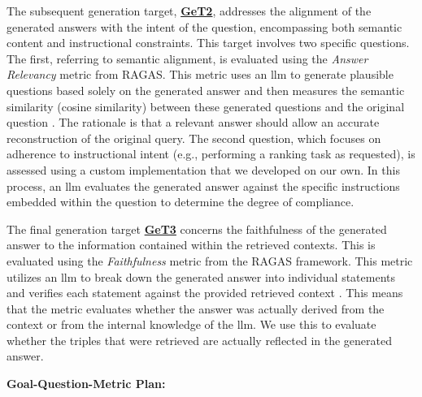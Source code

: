 The subsequent generation target, \hyperref[enum:get2]{\textbf{GeT2}}, addresses the alignment of the generated answers with the intent of the question, encompassing both semantic content and instructional constraints. This target involves two specific questions. The first, referring to semantic alignment, is evaluated using the \emph{Answer Relevancy} metric from RAGAS. This metric uses an \gls{llm} to generate plausible questions based solely on the generated answer and then measures the semantic similarity (cosine similarity) between these generated questions and the original question \cite{es_ragas_2023}. The rationale is that a relevant answer should allow an accurate reconstruction of the original query. The second question, which focuses on adherence to instructional intent (e.g., performing a ranking task as requested), is assessed using a custom implementation that we developed on our own. In this process, an \gls{llm} evaluates the generated answer against the specific instructions embedded within the question to determine the degree of compliance.

The final generation target \hyperref[enum:get3]{\textbf{GeT3}} concerns the faithfulness of the generated answer to the information contained within the retrieved contexts. This is evaluated using the \emph{Faithfulness} metric from the RAGAS framework. This metric utilizes an \gls{llm} to break down the generated answer into individual statements and verifies each statement against the provided retrieved context  \cite{es_ragas_2023}. This means that the metric evaluates whether the answer was actually derived from the context or from the internal knowledge of the \gls{llm}. We use this to evaluate whether the triples that were retrieved are actually reflected in the generated answer. 

\vspace{\medskipamount}
{\large\textbf{Goal-Question-Metric Plan:}} 
\label{sec:evaluation_gqm_plan}

